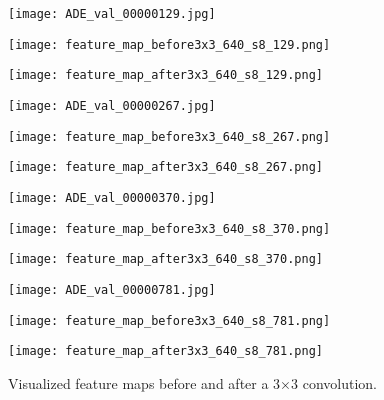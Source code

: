 \documentclass{article} \usepackage{iclr2024_conference,times}
\begin{document}
\begin{figure}
\centering
\begin{minipage}{0.8in}
\texttt{[image: ADE\_val\_00000129.jpg]}
\end{minipage}
\begin{minipage}{0.8in}
\texttt{[image: feature\_map\_before3x3\_640\_s8\_129.png]}
\end{minipage}
\begin{minipage}{0.8in}
\texttt{[image: feature\_map\_after3x3\_640\_s8\_129.png]}
\end{minipage}
\begin{minipage}{0.8in}
\texttt{[image: ADE\_val\_00000267.jpg]}
\end{minipage}
\begin{minipage}{0.8in}
\texttt{[image: feature\_map\_before3x3\_640\_s8\_267.png]}
\end{minipage}
\vspace{0.2em}
\begin{minipage}{0.8in}
\texttt{[image: feature\_map\_after3x3\_640\_s8\_267.png]}
\end{minipage}
\begin{minipage}{0.8in}
\texttt{[image: ADE\_val\_00000370.jpg]}
\end{minipage}
\begin{minipage}{0.8in}
\texttt{[image: feature\_map\_before3x3\_640\_s8\_370.png]}
\end{minipage}
\begin{minipage}{0.8in}
\texttt{[image: feature\_map\_after3x3\_640\_s8\_370.png]}
\end{minipage}
\begin{minipage}{0.8in}
\texttt{[image: ADE\_val\_00000781.jpg]}
\end{minipage}
\begin{minipage}{0.8in}
\texttt{[image: feature\_map\_before3x3\_640\_s8\_781.png]}
\end{minipage}
\begin{minipage}{0.8in}
\texttt{[image: feature\_map\_after3x3\_640\_s8\_781.png]}
\end{minipage}
\caption{Visualized feature maps before and after a 3$\times$3 convolution.}
\label{fig6}
\end{figure}
\end{document}

